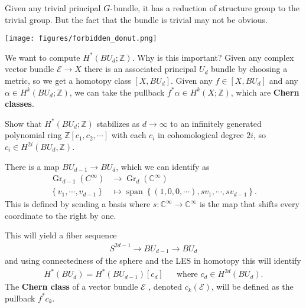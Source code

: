 \begin{example}[?]

Given any trivial principal \(G{\hbox{-}}\)bundle, it has a reduction of
structure group to the trivial group. But the fact that the bundle is
trivial may not be obvious.

\texttt{[image: figures/forbidden\_donut.png]}

\end{example}

\begin{remark}

We want to compute \(H^*(BU_d; {\mathbb{Z}})\). Why is this important?
Given any complex vector bundle \(\mathcal{E}\to X\) there is an
associated principal \(U_d\) bundle by choosing a metric, so we get a
homotopy class \([X, BU_d]\). Given any \(f\in [X, BU_d]\) and any
\(\alpha\in H^k(BU_d; {\mathbb{Z}})\), we can take the pullback
\(f^* \alpha \in H^k(X; {\mathbb{Z}})\), which are \textbf{Chern
classes}.

\end{remark}

\begin{exercise}[?]

Show that \(H^*(BU_d; {\mathbb{Z}})\) stabilizes as \(d\to \infty\) to
an infinitely generated polynomial ring
\({\mathbb{Z}}[c_1, c_2, \cdots]\) with each \(c_i\) in cohomological
degree \(2i\), so \(c_i \in H^{2i}(BU_d, {\mathbb{Z}})\).

\end{exercise}

\begin{definition}[?]

There is a map \(BU_{d-1} \to BU_d\), which we can identify as
\begin{align*}
{\operatorname{Gr}}_{d-1}(C^{\infty }) &\to {\operatorname{Gr}}_d({\mathbb{C}}^{\infty }) \\
\left\{{v_1, \cdots, v_{d-1}}\right\} &\mapsto {\operatorname{span}}\left\{{ (1, 0, 0, \cdots), sv_1, \cdots, sv_{d-1} }\right\}
.\end{align*}
This is defined by sending a basis where
\(s: {\mathbb{C}}^{\infty } \to {\mathbb{C}}^{\infty}\) is the map that
shifts every coordinate to the right by one.


This will yield a fiber sequence
\begin{align*}
S^{2d-1} \to BU_{d-1} \to BU_d
\end{align*}
and using connectedness of the sphere and the LES in homotopy this will
identify
\begin{align*}
H^*(BU_d) = H^*(BU_{d-1})[c_d] && \text{where } c_d \in H^{2d}(BU_d)
.\end{align*}
The \textbf{Chern class} of a vector bundle \(\mathcal{E}\) , denoted
\(c_k( \mathcal{E} )\), will be defined as the pullback \(f^* c_k\).

\end{definition}

